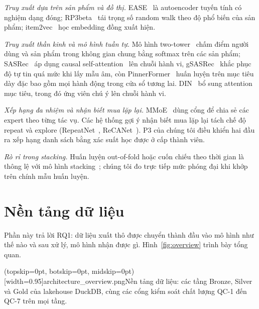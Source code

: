 \documentclass[jtehm]{ieeeaccess}
\begin{document}
\textit{Truy xuất dựa trên sản phẩm và đồ thị.} EASE~\cite{steck2019ease} là autoencoder tuyến tính có nghiệm dạng đóng; RP3beta~\cite{paudel2017rp3beta} tái trọng số random walk theo độ phổ biến của sản phẩm; item2vec~\cite{barkan2016item2vec} học embedding đồng xuất hiện.

\textit{Truy xuất thần kinh và mô hình tuần tự.} Mô hình two-tower~\cite{yi2019twotower} chấm điểm người dùng và sản phẩm trong không gian chung bằng softmax trên các sản phẩm; SASRec~\cite{kang2018sasrec} áp dụng causal self-attention~\cite{vaswani2017attention} lên chuỗi hành vi, gSASRec~\cite{petrov2023gsasrec} khắc phục độ tự tin quá mức khi lấy mẫu âm, còn PinnerFormer~\cite{pancha2022pinnerformer} huấn luyện trên mục tiêu dày đặc bao gồm mọi hành động trong cửa sổ tương lai. DIN~\cite{zhou2018din} bổ sung attention mục tiêu, trong đó ứng viên chú ý lên chuỗi hành vi.

\textit{Xếp hạng đa nhiệm và nhận biết mua lặp lại.} MMoE~\cite{ma2018mmoe} dùng cổng để chia sẻ các expert theo từng tác vụ. Các hệ thống gợi ý nhận biết mua lặp lại tách chế độ repeat và explore (RepeatNet~\cite{ren2019repeatnet}, ReCANet~\cite{ariannezhad2022recanet}). P3 của chúng tôi điều khiển hai đầu ra xếp hạng danh sách bằng xác suất học được ở cấp thành viên.

\textit{Rò rỉ trong stacking.} Huấn luyện out-of-fold hoặc cuốn chiếu theo thời gian là thông lệ với mô hình stacking~\cite{wolpert1992stacking}; chúng tôi đo trực tiếp mức phóng đại khi khớp trên chính mẫu huấn luyện.

\section{Nền tảng dữ liệu}
\label{sec:data}

Phần này trả lời RQ1: dữ liệu xuất thô được chuyển thành đầu vào mô hình như thế nào và sau xử lý, mô hình nhận được gì. Hình~\ref{fig:overview} trình bày tổng quan.

\Figure[t!](topskip=0pt, botskip=0pt, midskip=0pt)[width=0.95\textwidth]{architecture_overview.png}{Nền tảng dữ liệu: các tầng Bronze, Silver và Gold của lakehouse DuckDB, cùng các cổng kiểm soát chất lượng QC-1 đến QC-7 trên mọi tầng.\label{fig:overview}}
\end{document}
